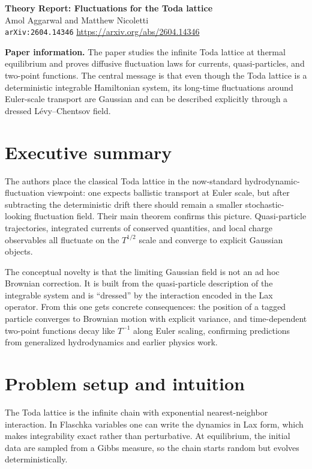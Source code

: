 \documentclass[11pt]{article}
\begin{document}
\begin{center}
{\Large \textbf{Theory Report: Fluctuations for the Toda lattice}}\\[0.5em]
{\large Amol Aggarwal and Matthew Nicoletti}\\[0.25em]
\texttt{arXiv:2604.14346} \quad \url{https://arxiv.org/abs/2604.14346}
\end{center}

\textbf{Paper information.} The paper studies the infinite Toda lattice at thermal equilibrium and proves diffusive fluctuation laws for currents, quasi-particles, and two-point functions. The central message is that even though the Toda lattice is a deterministic integrable Hamiltonian system, its long-time fluctuations around Euler-scale transport are Gaussian and can be described explicitly through a dressed L\'evy--Chentsov field.

\section*{Executive summary}
The authors place the classical Toda lattice in the now-standard hydrodynamic-fluctuation viewpoint: one expects ballistic transport at Euler scale, but after subtracting the deterministic drift there should remain a smaller stochastic-looking fluctuation field. Their main theorem confirms this picture. Quasi-particle trajectories, integrated currents of conserved quantities, and local charge observables all fluctuate on the $T^{1/2}$ scale and converge to explicit Gaussian objects.

The conceptual novelty is that the limiting Gaussian field is not an ad hoc Brownian correction. It is built from the quasi-particle description of the integrable system and is ``dressed'' by the interaction encoded in the Lax operator. From this one gets concrete consequences: the position of a tagged particle converges to Brownian motion with explicit variance, and time-dependent two-point functions decay like $T^{-1}$ along Euler scaling, confirming predictions from generalized hydrodynamics and earlier physics work.

\section*{Problem setup and intuition}
The Toda lattice is the infinite chain with exponential nearest-neighbor interaction. In Flaschka variables one can write the dynamics in Lax form, which makes integrability exact rather than perturbative. At equilibrium, the initial data are sampled from a Gibbs measure, so the chain starts random but evolves deterministically.
\end{document}
